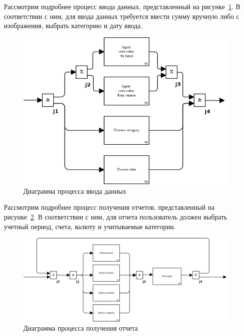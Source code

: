 \pagebreak
Рассмотрим подробнее процесс ввода данных,
представленный на рисунке~\ref{fig:idef3_input}.
В соответствии с ним, для ввода данных требуется
ввести сумму вручную либо с изображения, выбрать категорию и дату ввода.

\begin{figure}[h!]
  \centering
  \includegraphics[width=150mm]{pic/idef3_input}
  \caption{Диаграмма процесса ввода данных}
  \label{fig:idef3_input}
\end{figure}

\pagebreak
Рассмотрим подробнее процесс получения отчетов,
представленный на рисунке~\ref{fig:idef3_reports}.
В соответствии с ним, для отчета пользователь должен выбрать
учетный период, счета, валюту и учитываемые категории.

\begin{figure}[h!]
  \centering
  \includegraphics[width=150mm]{pic/idef3_reports}
  \caption{Диаграмма процесса получения отчета}
  \label{fig:idef3_reports}
\end{figure}

